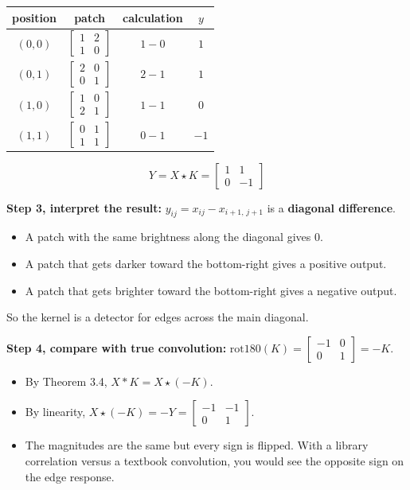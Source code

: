 \begin{center}
\begin{tabular}{cccc}
\toprule
position & patch & calculation & $y$ \\
\midrule
$(0,0)$ & $\begin{bmatrix} 1 & 2 \\ 1 & 0 \end{bmatrix}$ & $1 - 0$ & $1$ \\[8pt]
$(0,1)$ & $\begin{bmatrix} 2 & 0 \\ 0 & 1 \end{bmatrix}$ & $2 - 1$ & $1$ \\[8pt]
$(1,0)$ & $\begin{bmatrix} 1 & 0 \\ 2 & 1 \end{bmatrix}$ & $1 - 1$ & $0$ \\[8pt]
$(1,1)$ & $\begin{bmatrix} 0 & 1 \\ 1 & 1 \end{bmatrix}$ & $0 - 1$ & $-1$ \\
\bottomrule
\end{tabular}
\end{center}

\[
Y = X \star K = \begin{bmatrix} 1 & 1 \\ 0 & -1 \end{bmatrix}
\]

\textbf{Step 3, interpret the result:} $y_{ij} = x_{ij} - x_{i+1,\, j+1}$ is a \textbf{diagonal difference}.
\begin{itemize}
  \item A patch with the same brightness along the diagonal gives $0$.
  \item A patch that gets darker toward the bottom-right gives a positive output.
  \item A patch that gets brighter toward the bottom-right gives a negative output.
\end{itemize}
So the kernel is a detector for edges across the main diagonal.

\textbf{Step 4, compare with true convolution:} $\mathrm{rot180}(K) = \begin{bmatrix} -1 & 0 \\ 0 & 1 \end{bmatrix} = -K$.
\begin{itemize}
  \item By Theorem 3.4, $X * K = X \star (-K)$.
  \item By linearity, $X \star (-K) = -Y = \begin{bmatrix} -1 & -1 \\ 0 & 1 \end{bmatrix}$.
  \item The magnitudes are the same but every sign is flipped. With a library correlation versus a textbook convolution, you would see the opposite sign on the edge response.
\end{itemize}

